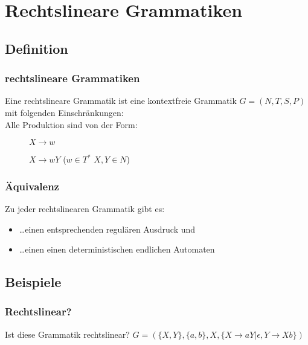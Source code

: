 \section{Rechtslineare Grammatiken}
\subsection{Definition}
\begin{frame}
	\frametitle{rechtslineare Grammatiken}
	\begin{definition}
  		Eine rechtslineare Grammatik ist eine kontextfreie Grammatik $G=(N,T,S,P)$ mit folgenden Einschränkungen:\\
      Alle Produktion sind von der Form:
  		\begin{description}
        \item[] $X \rightarrow w$
        \item[] $X \rightarrow wY$ \hfill ($w \in T^*$\hspace{0.25em} $X,Y \in N$)
  		\end{description}
	\end{definition}
\end{frame}
\begin{frame}
  \frametitle{Äquivalenz}
   Zu jeder rechtslinearen Grammatik gibt es:
	\begin{itemize}
		\item \ldots einen entsprechenden regulären Ausdruck und \pause
		\item \ldots einen einen deterministischen endlichen Automaten
   \end{itemize}
\end{frame}

\subsection{Beispiele}
\begin{frame}
	\frametitle{Rechtslinear?}
	\begin{exampleblock}{Ist diese Grammatik rechtslinear?}
    $G=(\{X,Y\},\{a,b\},X,\{X \rightarrow aY | \epsilon, Y \rightarrow Xb\})$\\
    \begin{description}
    \end{description}
	\end{exampleblock}
\end{frame}

